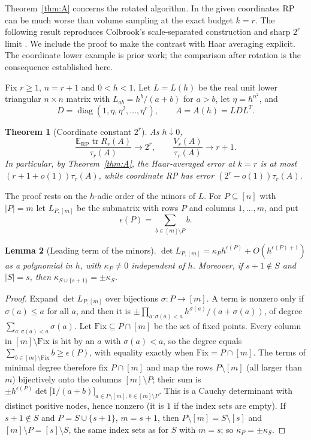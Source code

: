 \documentclass[11pt,a4paper]{article}
\newtheorem{theorem}{Theorem}[section]
\newtheorem{lemma}[theorem]{Lemma}
\theoremstyle{definition}
\newcommand{\E}{\mathbb{E}}
\newcommand{\tr}{\operatorname{tr}}
\newcommand{\diag}{\operatorname{diag}}
\newcommand{\RP}{\mathrm{RP}}
\begin{document}
Theorem~\ref{thm:A} concerns the rotated algorithm. In the given coordinates RP can be much worse than volume sampling at the exact budget $k=r$. The following result reproduces Colbrook's scale-separated construction and sharp $2^r$ limit \cite[Thm.~1]{Colbrook}. We include the proof to make the contrast with Haar averaging explicit. The coordinate lower example is prior work; the comparison after rotation is the consequence established here.

Fix $r\ge1$, $n=r+1$ and $0<h<1$. Let $L=L(h)$ be the real unit lower triangular $n\times n$ matrix with $L_{ab}=h^b/(a+b)$ for $a>b$, let $\eta=h^{n^2}$, and
\[
D=\diag(1,\eta,\eta^2,\dots,\eta^{r}),\qquad A=A(h)=LDL^{T}.
\]

\begin{theorem}[Coordinate constant $2^r$]\label{thm:contrast}
As $h\downarrow0$,
\[
\frac{\E_{\RP}\tr R_r(A)}{\tau_r(A)}\longrightarrow2^r,\qquad \frac{V_r(A)}{\tau_r(A)}\longrightarrow r+1 .
\]
In particular, by Theorem~\ref{thm:A}, the Haar-averaged error at $k=r$ is at most $(r+1+o(1))\tau_r(A)$, while coordinate RP has error $(2^r-o(1))\tau_r(A)$.
\end{theorem}

The proof rests on the $h$-adic order of the minors of $L$. For $P\subseteq[n]$ with $|P|=m$ let $L_{P,[m]}$ be the submatrix with rows $P$ and columns $1,\dots,m$, and put
\[
\epsilon(P)=\sum_{b\in[m]\setminus P}b .
\]

\begin{lemma}[Leading term of the minors]\label{lem:cauchy}
$\det L_{P,[m]}=\kappa_Ph^{\epsilon(P)}+O(h^{\epsilon(P)+1})$ as a polynomial in $h$, with $\kappa_P\ne0$ independent of $h$. Moreover, if $s+1\notin S$ and $|S|=s$, then $\kappa_{S\cup\{s+1\}}=\pm\kappa_S$.
\end{lemma}

\begin{proof}
Expand $\det L_{P,[m]}$ over bijections $\sigma:P\to[m]$. A term is nonzero only if $\sigma(a)\le a$ for all $a$, and then it is $\pm\prod_{a:\sigma(a)<a}h^{\sigma(a)}/(a+\sigma(a))$, of degree $\sum_{a:\sigma(a)<a}\sigma(a)$. Let $\mathrm{Fix}\subseteq P\cap[m]$ be the set of fixed points. Every column in $[m]\setminus\mathrm{Fix}$ is hit by an $a$ with $\sigma(a)<a$, so the degree equals $\sum_{b\in[m]\setminus\mathrm{Fix}}b\ge\epsilon(P)$, with equality exactly when $\mathrm{Fix}=P\cap[m]$. The terms of minimal degree therefore fix $P\cap[m]$ and map the rows $P\setminus[m]$ (all larger than $m$) bijectively onto the columns $[m]\setminus P$; their sum is $\pm h^{\epsilon(P)}\det\big[1/(a+b)\big]_{a\in P\setminus[m],\,b\in[m]\setminus P}$. This is a Cauchy determinant with distinct positive nodes, hence nonzero (it is $1$ if the index sets are empty). If $s+1\notin S$ and $P=S\cup\{s+1\}$, $m=s+1$, then $P\setminus[m]=S\setminus[s]$ and $[m]\setminus P=[s]\setminus S$, the same index sets as for $S$ with $m=s$; so $\kappa_P=\pm\kappa_S$.
\end{proof}
\end{document}
